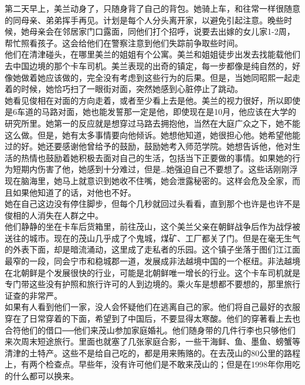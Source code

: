 第二天早上，美兰动身了，只随身背了自己的背包。她骑上车，和往常一样很随意的同母亲、弟弟挥手再见。计划是每个人分头离开家，以避免引起注意。晚些时候，她母亲会在邻居家门口露面，同他们打个招呼，说要去出嫁的女儿家1-2周，帮忙照看孩子。这会给他们在警察注意到他们失踪前争取些时间。\\

他们在清津碰头，在哪里美兰的姐姐有个公寓。美兰和姐姐徒步出发去找能载他们去中国边境的那个卡车司机。美兰表现的出奇的镇定，每一步都像是纯自然的，好像她做着她应该做的，完全没有考虑到这些行为的后果。但是，当她同昭熙一起走着的时候，她恰巧扫了一眼街对面，突然她感到心脏停止了跳动。\\

她看见俊相在对面的方向走着，或者至少看上去是他。美兰的视力很好，所以即使是6车道的马路对面，她也能发誓那一定是他，即使现在是10月，他应该在大学的研究所里。她第一的反应就是想穿过马路去拥抱他，当然在大庭广众之下，她不能这么做。但是，她有太多事情要向他倾诉。她想他知道，她很担心他。她希望他能过的好。她还要感谢他曾给予的鼓励，鼓励她考入师范学院。她想告诉他，他对生活的热情也鼓励着她积极去面对自己的生活，包括当下正要做的事情。如果她的行为短期内伤害了他，她感到十分难过，但是…她强迫自己不要想了。这些话刚刚浮现在脑海里，她马上就意识到她收不住嘴，她会泄露秘密的。这样会危及全家，而且如果他知道了的话，对他也不好。\\

她在自己这边没有停住脚步，但每个几秒就回过头看看，直到那个也许是也许不是俊相的人消失在人群之中。\\

他们静静的坐在卡车后货箱里，前往茂山，这个美兰父亲在朝鲜战争后作为战俘被送往的城市。现在的茂山几乎成了个鬼城，煤矿、工厂都关了门。但是在毫无生气的外表下面，却是暗流涌动，这里成了走私者的乐园。这个镇子坐落于图们江江面最窄的一段，同会宁市和稳城郡一道，发展成非法越境中国的一个枢纽。非法越境在北朝鲜是个发展很快的行业，可能是北朝鲜唯一增长的行业。这个卡车司机就是专门带这些没有护照和旅行许可的人到边境的。乘火车是想都不要想的，那里旅行证查的非常严。\\

如果有人看到他们一家，没人会怀疑他们在逃离自己的家。他们将自己最好的衣服穿在了日常穿着的下面，希望到了中国后，不要显得太寒酸。他们的穿著看上去也合符他们的借口──他们来茂山参加家庭婚礼。他们随身带的几件行李也只够他们来次周末短途旅行。里面也就塞了几张家庭合影，一些干海鲜、鱼、墨鱼、螃蟹等清津的土特产。这些不是给自己吃的，都是用来贿赂的。在去茂山的80公里的路程上，有两个检查点。早些年，没有许可他们是不敢来茂山的；但是在1998年你用吃的什么都可以换来。\\

